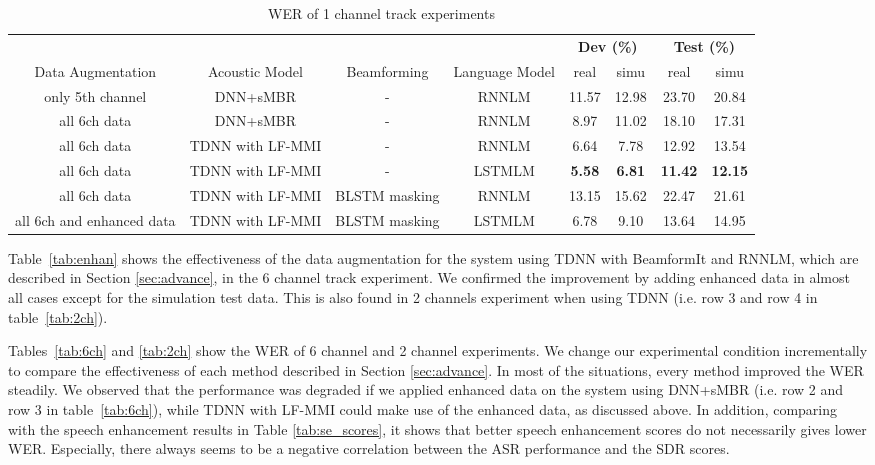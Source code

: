 \documentclass[a4paper]{article}
\begin{document}
\begin{table*}[tbh]
\bigskip
\caption{WER of 1 channel track experiments}
  \label{tab:1ch}
  \centering
  \begin{tabular}{ c c c c c c c c }
    \toprule
    \multicolumn{4}{c}{} & \multicolumn{2}{c}{\textbf{Dev (\%)}} & \multicolumn{2}{c}{\textbf{Test (\%)}} \\
   	Data Augmentation & Acoustic Model & Beamforming & Language Model & real & simu & real & simu \\
   	\midrule
    only 5th channel & DNN+sMBR & - & RNNLM & 11.57 & 12.98 & 23.70 & 20.84 \\
    all 6ch data & DNN+sMBR & - & RNNLM & 8.97 & 11.02 & 18.10 & 17.31 \\
    all 6ch data & TDNN with LF-MMI & - & RNNLM & 6.64 & 7.78 & 12.92 & 13.54 \\
    all 6ch data & TDNN with LF-MMI & - & LSTMLM & \textbf{5.58} & \textbf{6.81} & \textbf{11.42} & \textbf{12.15} \\
    all 6ch data & TDNN with LF-MMI & BLSTM masking & RNNLM & 13.15 & 15.62 & 22.47 & 21.61 \\
    all 6ch and enhanced data & TDNN with LF-MMI & BLSTM masking & LSTMLM & 6.78 & 9.10 & 13.64 & 14.95 \\
    \bottomrule
  \end{tabular}
\end{table*}

Table~\ref{tab:enhan} shows the effectiveness of the data augmentation for the system using TDNN with BeamformIt and RNNLM, which are described in Section \ref{sec:advance}, in the 6 channel track experiment. 
We confirmed the improvement by adding enhanced data in almost all cases except for the simulation test data. 
This is also found in 2 channels experiment when using TDNN (i.e. row 3 and row 4 in table~\ref{tab:2ch}).

Tables~\ref{tab:6ch} and \ref{tab:2ch} show the WER of 6 channel and 2 channel experiments. 
We change our experimental condition incrementally to compare the effectiveness of each method described in Section \ref{sec:advance}. 
In most of the situations, every method improved the WER steadily. 
We observed that the performance was degraded if we applied enhanced data on the system using DNN+sMBR (i.e. row 2 and row 3 in table~\ref{tab:6ch}), while TDNN with LF-MMI could make use of the enhanced data, as discussed above.
In addition, comparing with the speech enhancement results in Table \ref{tab:se_scores}, it shows that better speech enhancement scores do not necessarily gives lower WER. 
Especially, there always seems to be a negative correlation between the ASR performance and the SDR scores.
\end{document}
